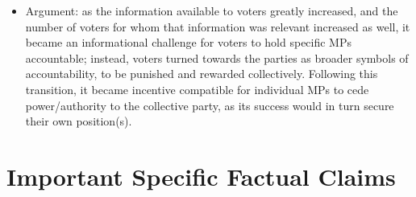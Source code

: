 \documentclass[12pt]{article}
\begin{document}
\begin{itemize}[leftmargin=*, itemsep=4pt]
\begin{enumerate}
        \item ``Since the benefit to acquiring information depends on the chances that the information will actually change the vote decision, any process whereby nineteenth century MPs became more confident that their party's line would be acceptable to them were they to investigate the matter thoroughly should have increased party voting. Party cohesion should have increased when the probability of agreement between the party and other relevant groups increased.''
    \end{enumerate}
    \item Argument: as the information available to voters greatly increased, and the number of voters for whom that information was relevant increased as well, it became an informational challenge for voters to hold specific MPs accountable; instead, voters turned towards the parties as broader symbols of accountability, to be punished and rewarded collectively. Following this transition, it became incentive compatible for individual MPs to cede power/authority to the collective party, as its success would in turn secure their own position(s).
\end{itemize}


\section{Important Specific Factual Claims}
\end{document}
